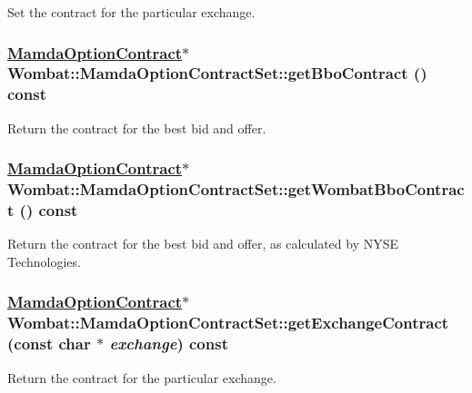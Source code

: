 Set the contract for the particular exchange. 

\hypertarget{classWombat_1_1MamdaOptionContractSet_e643beece623c917a6b496ce2152217b}{
\subsubsection[getBboContract]{\setlength{\rightskip}{0pt plus 5cm}\hyperlink{classWombat_1_1MamdaOptionContract}{Mamda\-Option\-Contract}$\ast$ Wombat::Mamda\-Option\-Contract\-Set::get\-Bbo\-Contract () const}}
\label{classWombat_1_1MamdaOptionContractSet_e643beece623c917a6b496ce2152217b}


Return the contract for the best bid and offer. 

\hypertarget{classWombat_1_1MamdaOptionContractSet_1f26638ea5009048fa21d9d6e61ace3a}{
\subsubsection[getWombatBboContract]{\setlength{\rightskip}{0pt plus 5cm}\hyperlink{classWombat_1_1MamdaOptionContract}{Mamda\-Option\-Contract}$\ast$ Wombat::Mamda\-Option\-Contract\-Set::get\-Wombat\-Bbo\-Contract () const}}
\label{classWombat_1_1MamdaOptionContractSet_1f26638ea5009048fa21d9d6e61ace3a}


Return the contract for the best bid and offer, as calculated by NYSE Technologies. 

\hypertarget{classWombat_1_1MamdaOptionContractSet_5077c90f87d60c589172a33634f8cc2c}{
\subsubsection[getExchangeContract]{\setlength{\rightskip}{0pt plus 5cm}\hyperlink{classWombat_1_1MamdaOptionContract}{Mamda\-Option\-Contract}$\ast$ Wombat::Mamda\-Option\-Contract\-Set::get\-Exchange\-Contract (const char $\ast$ {\em exchange}) const}}
\label{classWombat_1_1MamdaOptionContractSet_5077c90f87d60c589172a33634f8cc2c}


Return the contract for the particular exchange. 


